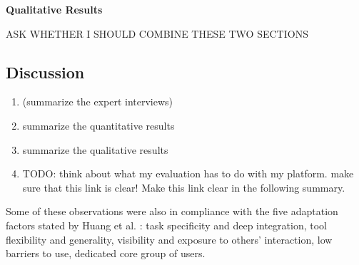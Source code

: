 



\textbf{Qualitative Results}

	ASK WHETHER I SHOULD COMBINE THESE TWO SECTIONS











\subsection{Discussion}


	\begin{enumerate}
	\item (summarize the expert interviews)
	\item summarize the quantitative results
	\item summarize the qualitative results 
	\item TODO: think about what my evaluation has to do with my platform. make sure that this link is clear! Make this link clear in the following summary.
	\end{enumerate}


	Some of these observations were also in compliance with the five adaptation factors stated by Huang et al. \cite{Huang2004}: task specificity and deep integration, tool flexibility and generality, visibility and exposure to others' interaction, low barriers to use, dedicated core group of users.

